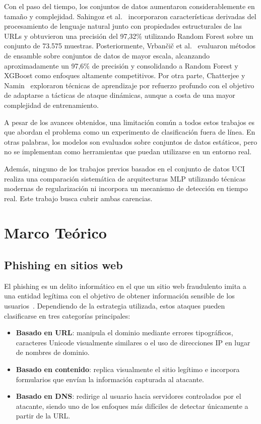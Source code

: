 \documentclass[conference]{IEEEtran}
\begin{document}
Con el paso del tiempo, los conjuntos de datos aumentaron considerablemente en tamaño y complejidad. Sahingoz et al.~\cite{sahingoz2019} incorporaron características derivadas del procesamiento de lenguaje natural junto con propiedades estructurales de las URLs y obtuvieron una precisión del 97,32\% utilizando Random Forest sobre un conjunto de 73.575 muestras. Posteriormente, Vrban{\v{c}}i{\v{c}} et al.~\cite{vrbancic2020} evaluaron métodos de ensamble sobre conjuntos de datos de mayor escala, alcanzando aproximadamente un 97,6\% de precisión y consolidando a Random Forest y XGBoost como enfoques altamente competitivos. Por otra parte, Chatterjee y Namin~\cite{chatterjee2019} exploraron técnicas de aprendizaje por refuerzo profundo con el objetivo de adaptarse a tácticas de ataque dinámicas, aunque a costa de una mayor complejidad de entrenamiento.

A pesar de los avances obtenidos, una limitación común a todos estos trabajos es que abordan el problema como un experimento de clasificación fuera de línea. En otras palabras, los modelos son evaluados sobre conjuntos de datos estáticos, pero no se implementan como herramientas que puedan utilizarse en un entorno real.

Además, ninguno de los trabajos previos basados en el conjunto de datos UCI realiza una comparación sistemática de arquitecturas MLP utilizando técnicas modernas de regularización ni incorpora un mecanismo de detección en tiempo real. Este trabajo busca cubrir ambas carencias.

\section{Marco Teórico}

\subsection{Phishing en sitios web}

El phishing es un delito informático en el que un sitio web fraudulento imita a una entidad legítima con el objetivo de obtener información sensible de los usuarios~\cite{mohammad2012}. Dependiendo de la estrategia utilizada, estos ataques pueden clasificarse en tres categorías principales:

\begin{itemize}
\item \textbf{Basado en URL}: manipula el dominio mediante errores tipográficos, caracteres Unicode visualmente similares o el uso de direcciones IP en lugar de nombres de dominio.

\item \textbf{Basado en contenido}: replica visualmente el sitio legítimo e incorpora formularios que envían la información capturada al atacante.

\item \textbf{Basado en DNS}: redirige al usuario hacia servidores controlados por el atacante, siendo uno de los enfoques más difíciles de detectar únicamente a partir de la URL.
\end{itemize}
\end{document}
